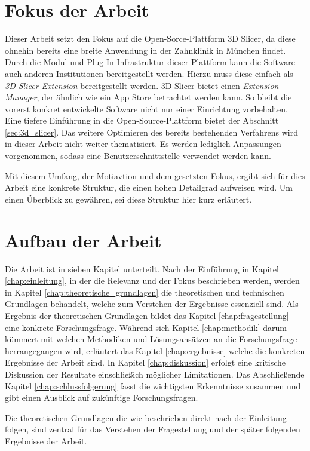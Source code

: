 \section{Fokus der Arbeit}
\label{sec:fokus_der-arbeit} Dieser Arbeit setzt den Fokus auf die Open-Sorce-Plattform
3D Slicer, da diese ohnehin bereits eine breite Anwendung in der Zahnklinik in
München findet. Durch die Modul und Plug-In Infrastruktur dieser Plattform kann die
Software auch anderen Institutionen bereitgestellt werden. Hierzu muss diese
einfach als \textit{3D Slicer Extension} bereitgestellt werden. 3D Slicer bietet
einen \textit{Extension Manager}, der ähnlich wie ein App Store betrachtet
werden kann. So bleibt die vorerst konkret entwickelte Software nicht nur einer Einrichtung
vorbehalten. Eine tiefere Einführung in die Open-Source-Plattform bietet der
Abschnitt \ref{sec:3d_slicer}. Das weitere Optimieren des bereits bestehenden Verfahrens
wird in dieser Arbeit nicht weiter thematisiert. Es werden lediglich Anpassungen
vorgenommen, sodass eine Benutzerschnittstelle verwendet werden kann.

Mit diesem Umfang, der Motiavtion und dem gesetzten Fokus, ergibt sich für dies Arbeit
eine konkrete Struktur, die einen hohen Detailgrad aufweisen wird. Um einen Überblick
zu gewähren, sei diese Struktur hier kurz erläutert.

\section{Aufbau der Arbeit}
\label{sec:aufbau_der_arbeit} Die Arbeit ist in sieben Kapitel unterteilt. Nach der
Einführung in Kapitel \ref{chap:einleitung}, in der die Relevanz und der Fokus
beschrieben werden, werden in Kapitel \ref{chap:theoretische_grundlagen} die theoretischen
und technischen Grundlagen behandelt, welche zum Verstehen der Ergebnisse
essenziell sind. Als Ergebnis der theoretischen Grundlagen bildet das Kapitel \ref{chap:fragestellung}
eine konkrete Forschungsfrage. Während sich Kapitel \ref{chap:methodik} darum
kümmert mit welchen Methodiken und Lösungsansätzen an die Forschungsfrage
herrangegangen wird, erläutert das Kapitel \ref{chap:ergebnisse} welche die konkreten
Ergebnisse der Arbeit sind. In Kapitel \ref{chap:diskussion} erfolgt eine
kritische Diskussion der Resultate einschließich möglicher Limitationen. Das Abschließende
Kapitel \ref{chap:schlussfolgerung} fasst die wichtigsten Erkenntnisse zusammen und
gibt einen Ausblick auf zukünftige Forschungsfragen.

Die theoretischen Grundlagen die wie beschrieben direkt nach der Einleitung folgen,
sind zentral für das Verstehen der Fragestellung und der später folgenden
Ergebnisse der Arbeit.
